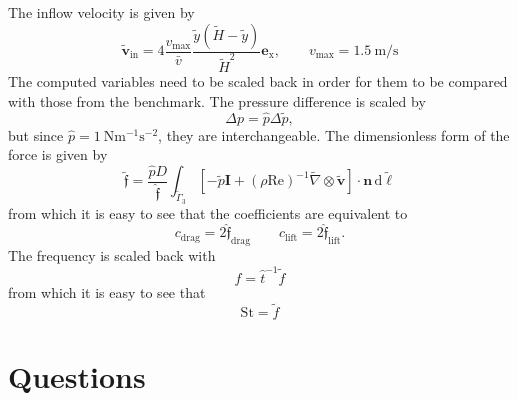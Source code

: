 \documentclass[]{scrartcl}
\renewcommand{\d}{\,\mathrm{d}}
\newcommand{\bs}[1]{\boldsymbol{#1}}
\begin{document}
The inflow velocity is given by
\begin{equation*}
	\mathbf{\tilde{v}}_\textrm{in} = 4\dfrac{v_\textrm{max}}{\bar{v}}\dfrac{\tilde{y}(\tilde{H}-\tilde{y})}{\tilde{H}^2}\mathbf{e}_\textrm{x},
	\qquad
	v_\textrm{max} = \SI{1.5}{\meter\per\second}
\end{equation*}
The computed variables need to be scaled back in order for them to be compared with those from the benchmark. The pressure difference is scaled by
\begin{equation*}
	\Delta p = \hat{p} \Delta \tilde{p},
\end{equation*}
but since $\hat{p} = \SI{1}{\newton\meter^{-1}\second^{-2}}$, they are interchangeable. The dimensionless form of the force is given by
\begin{equation*}
	\bs{\tilde{\mathfrak{f}}} = \dfrac{\hat{p}D}{\hat{\mathfrak{f}}} \int_{\tilde{\Gamma}_3} [-\tilde{p}\mathbf{I} + (\rho\textrm{Re})^{-1} \tilde{\nabla} \otimes \mathbf{\tilde{v}}] \cdot \mathbf{n} \d \tilde{\ell}
\end{equation*}
from which it is easy to see that the coefficients are equivalent to
\begin{equation*}
	c_\textrm{drag} = 2 \hat{\mathfrak{f}}_\textrm{drag}
	\qquad
	c_\textrm{lift} = 2 \hat{\mathfrak{f}}_\textrm{lift}.
\end{equation*}
The frequency is scaled back with
\begin{equation*}
	f = \hat{t}^{-1} \tilde{f}
\end{equation*}
from which it is easy to see that 
\begin{equation*}
	\textrm{St} = \tilde{f}
\end{equation*}

\section{Questions}
\end{document}
